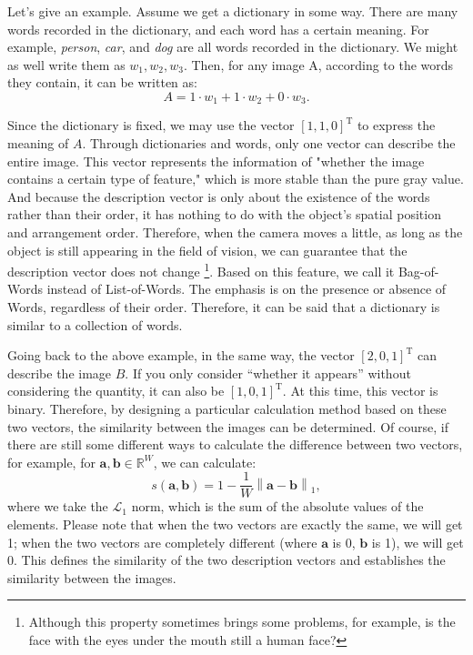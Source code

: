 Let's give an example. Assume we get a dictionary in some way. There are many words recorded in the dictionary, and each word has a certain meaning. For example, \textit{person}, \textit{car}, and \textit{dog} are all words recorded in the dictionary. We might as well write them as $w_1, w_2, w_3$. Then, for any image A, according to the words they contain, it can be written as:
\begin{equation}
	A = 1 \cdot w_1+1\cdot w_2 + 0 \cdot w_3.
\end{equation}

Since the dictionary is fixed, we may use the vector $[1,1,0]^\mathrm{T}$ to express the meaning of $A$. Through dictionaries and words, only one vector can describe the entire image. This vector represents the information of "whether the image contains a certain type of feature," which is more stable than the pure gray value. And because the description vector is only about the existence of the words rather than their order, it has nothing to do with the object's spatial position and arrangement order. Therefore, when the camera moves a little, as long as the object is still appearing in the field of vision, we can guarantee that the description vector does not change \footnote{Although this property sometimes brings some problems, for example, is the face with the eyes under the mouth still a human face? }. Based on this feature, we call it Bag-of-Words instead of List-of-Words. The emphasis is on the presence or absence of Words, regardless of their order. Therefore, it can be said that a dictionary is similar to a collection of words.

Going back to the above example, in the same way, the vector $[2,0,1]^\mathrm{T}$ can describe the image $B$. If you only consider ``whether it appears'' without considering the quantity, it can also be $[1,0,1]^\mathrm{T}$. At this time, this vector is binary. Therefore, by designing a particular calculation method based on these two vectors, the similarity between the images can be determined. Of course, if there are still some different ways to calculate the difference between two vectors, for example, for $\mathbf{a}, \mathbf{b} \in \mathbb{R}^W$, we can calculate:
\begin{equation}
	s\left( {\mathbf{a},\mathbf{b}} \right) = 1 - \frac{1}{W}\left\| {\mathbf{a} - \mathbf{b}} \right\|_1,
\end{equation}
where we take the $\mathcal{L}_1$ norm, which is the sum of the absolute values of the elements. Please note that when the two vectors are exactly the same, we will get 1; when the two vectors are completely different (where $\mathbf{a}$ is 0, $\mathbf{b}$ is 1), we will get 0. This defines the similarity of the two description vectors and establishes the similarity between the images.

